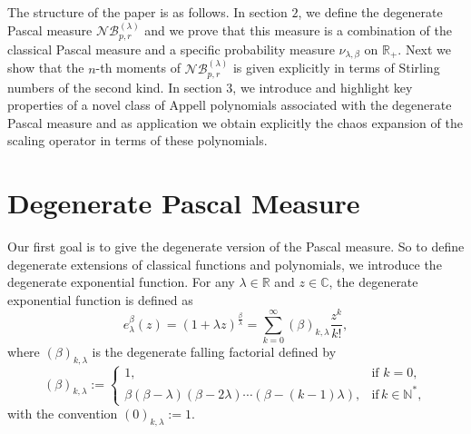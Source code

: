 \documentclass{birkjour}
\theoremstyle{definition}
\theoremstyle{remark}
\numberwithin{equation}{section}
\begin{document}
The structure of the paper is as follows. In section $2$, we define
the degenerate Pascal measure $\mathcal{NB}^{(\lambda)}_{p, r}$ and
we prove that this measure is a combination of the classical Pascal
measure and a specific probability measure $\nu_{\lambda, \beta}$ on
$\mathbb{R}_{+}$. Next we show that the $n$-th moments of
$\mathcal{NB}^{(\lambda)}_{p, r}$ is given explicitly in terms of
Stirling numbers of the second kind. In section 3, we introduce and
highlight key properties of a novel class of Appell polynomials
associated with the degenerate Pascal measure and as application we
obtain explicitly the chaos expansion of the scaling operator in
terms of these polynomials.
\section{Degenerate Pascal Measure}
Our first goal is to give the degenerate version of the Pascal
measure. So to define degenerate extensions of classical functions
and polynomials, we introduce the degenerate exponential function.
For any $\lambda\in \mathbb{R}$ and $z\in \mathbb{C}$, the
degenerate exponential function is defined as
\begin{equation}\label{Degenerate-exp}
e^{\beta}_{\lambda}(z)=(1+\lambda
z)^{\frac{\beta}{\lambda}}=\displaystyle{\sum^{\infty}_{k=0}(\beta)_{k,
\lambda}\frac{z^{k}}{k!}},
\end{equation}
where $(\beta)_{k,\lambda}$ is the degenerate falling factorial
defined by
\begin{equation}\label{Degenerate-falling}
(\beta)_{k,\lambda}:=
\begin{cases}
1, & \text{if } k=0, \\
\beta(\beta- \lambda)(\beta- 2\lambda)\cdots (\beta-(k-1)\lambda), &
\text{if}\, k \in \mathbb{N}^{\ast},
\end{cases}
\end{equation}
with the convention $(0)_{k,\lambda}:=1$.
\end{document}
